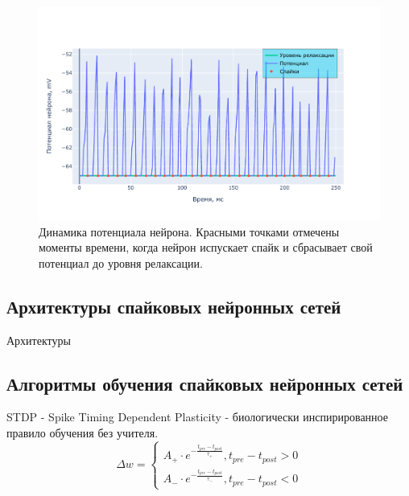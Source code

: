 \documentclass[a4paper]{article}
\begin{document}
\begin{center}
\begin{figure}[H] 
 \includegraphics[width=\textwidth,keepaspectratio=true]{voltage_ru.pdf}
 \caption{Динамика потенциала нейрона. Красными точками отмечены моменты времени, когда нейрон испускает спайк и сбрасывает свой потенциал до уровня релаксации.}
\end{figure}
\end{center}

\subsection{Архитектуры спайковых нейронных сетей}
Архитектуры

\subsection{Алгоритмы обучения спайковых нейронных сетей}

STDP - Spike Timing Dependent Plasticity - биологически инспирированное правило обучения без учителя.
\begin{equation} 
\Delta w =
 \begin{cases}
 A_+ \cdot e^{- \frac{t_{pre} - t_{post}}{\tau_+}}, t_{pre} - t_{post} > 0\\
 A_- \cdot e^{- \frac{t_{pre} - t_{post}}{\tau_-}}, t_{pre} - t_{post} < 0
 \end{cases}
\end{equation}
\end{document}
